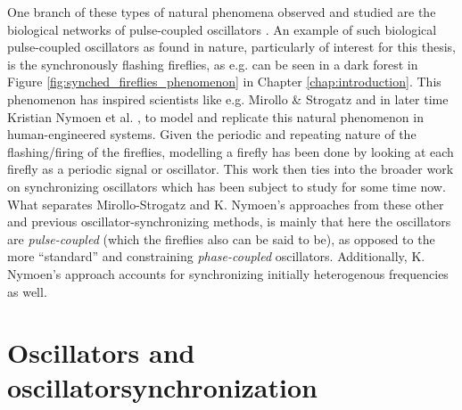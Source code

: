 One branch of these types of natural phenomena observed and studied are the biological networks of pulse-coupled oscillators \cite{proskurnikov_synchronization_2016, neda2000selfsorganizing}. An example of such biological pulse-coupled oscillators as found in nature, particularly of interest for this thesis, is the synchronously flashing fireflies, as e.g. can be seen in a dark forest in Figure \ref{fig:synched_fireflies_phenomenon} in Chapter \ref{chap:introduction}. This phenomenon has inspired scientists like e.g. Mirollo \& Strogatz \cite{mirollo_strogatz_PCO_synch} and in later time Kristian Nymoen et al. \cite{nymoen_synch}, to model and replicate this natural phenomenon in human-engineered systems. Given the periodic and repeating nature of the flashing/firing of the fireflies, modelling a firefly has been done by looking at each firefly as a periodic signal or oscillator. This work \cite{mirollo_strogatz_PCO_synch, nymoen_synch} then ties into the broader work on synchronizing oscillators which has been subject to study for some time now. What separates Mirollo-Strogatz and K. Nymoen's approaches from these other and previous oscillator-synchronizing methods, is mainly that here the oscillators are \textit{pulse-coupled} (which the fireflies also can be said to be), as opposed to the more ``standard'' and constraining \textit{phase-coupled} oscillators. Additionally, K. Nymoen's approach accounts for synchronizing initially heterogenous frequencies as well.




\section{Oscillators and oscillatorsynchronization}





